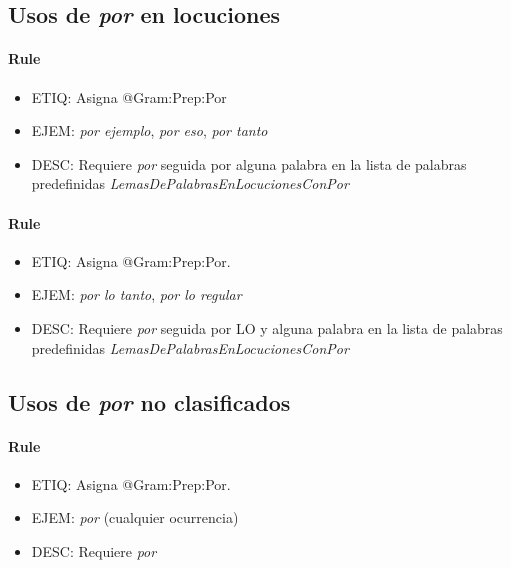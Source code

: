 \documentclass[11pt]{report}
\begin{document}
\subsection{Usos de \emph{por} en locuciones}
\paragraph*{Rule}
\begin{itemize}
\item ETIQ: Asigna @Gram:Prep:Por
\item EJEM: \emph{por ejemplo}, \emph{por eso}, \emph{por tanto}
\item DESC: Requiere \emph{por} seguida por alguna palabra en la lista de palabras predefinidas \emph{LemasDePalabrasEnLocucionesConPor}
\end{itemize}

\paragraph*{Rule}
\begin{itemize}
\item ETIQ: Asigna @Gram:Prep:Por.
\item EJEM: \emph{por lo tanto}, \emph{por lo regular}
\item DESC: Requiere \emph{por} seguida por LO y alguna palabra en la lista de palabras predefinidas \emph{LemasDePalabrasEnLocucionesConPor}
\end{itemize}

\subsection{Usos de \emph{por} no clasificados}
\paragraph*{Rule}
\begin{itemize}
\item ETIQ: Asigna @Gram:Prep:Por.
\item EJEM: \emph{por} (cualquier ocurrencia)
\item DESC: Requiere \emph{por}
\end{itemize}
\end{document}
